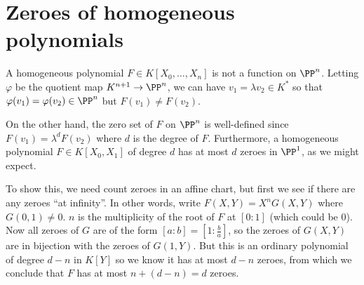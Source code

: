 

\section{Zeroes of homogeneous polynomials}
A homogeneous polynomial $F\in K[X_0,\ldots,X_n]$ is not a function on $\PP^n$. Letting $\varphi$ be the quotient map $K^{n+1}\to\PP^n$, we can have $v_1 = \lambda v_2\in K^*$ so that $\varphi(v_1)=\varphi(v_2)\in\PP^n$ but $F(v_1)\neq F(v_2)$.

On the other hand, the zero set of $F$ on $\PP^n$ is well-defined since $F(v_1)=\lambda^d F(v_2)$ where $d$ is the degree of $F$. Furthermore, a homogeneous polynomial $F\in K[X_0, X_1]$ of degree $d$ has at most $d$ zeroes in $\PP^1$, as we might expect.

To show this, we need count zeroes in an affine chart, but first we see if there are any zeroes ``at infinity''. In other words, write $F(X,Y) = X^nG(X,Y)$ where $G(0,1)\neq 0$. $n$ is the multiplicity of the root of $F$ at $[0:1]$ (which could be 0). Now all zeroes of $G$ are of the form $[a:b]=[1:\frac{b}{a}]$, so the zeroes of $G(X,Y)$ are in bijection with the zeroes of $G(1,Y)$. But this is an ordinary polynomial of degree $d-n$ in $K[Y]$ so we know it has at most $d-n$ zeroes, from which we conclude that $F$ has at most $n+(d-n)=d$ zeroes.

